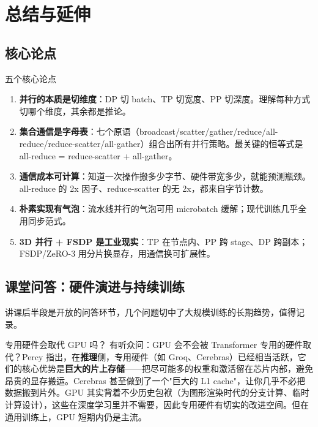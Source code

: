 \documentclass[a4paper]{article}
\begin{document}
\section{总结与延伸}

\subsection{核心论点}

\begin{importantbox}{五个核心论点}
\begin{enumerate}
\item \textbf{并行的本质是切维度}：DP 切 batch、TP 切宽度、PP 切深度。理解每种方式切哪个维度，其余都是推论。
\item \textbf{集合通信是字母表}：七个原语（broadcast/scatter/gather/reduce/all-reduce/reduce-scatter/all-gather）组合出所有并行策略。最关键的恒等式是 all-reduce = reduce-scatter + all-gather。
\item \textbf{通信成本可计算}：知道一次操作搬多少字节、硬件带宽多少，就能预测瓶颈。all-reduce 的 2x 因子、reduce-scatter 的无 2x，都来自字节计数。
\item \textbf{朴素实现有气泡}：流水线并行的气泡可用 microbatch 缓解；现代训练几乎全用同步范式。
\item \textbf{3D 并行 + FSDP 是工业现实}：TP 在节点内、PP 跨 stage、DP 跨副本；FSDP/ZeRO-3 用分片换显存，用通信换可扩展性。
\end{enumerate}
\end{importantbox}

\subsection{课堂问答：硬件演进与持续训练}

讲课后半段是开放的问答环节，几个问题切中了大规模训练的长期趋势，值得记录。

\begin{knowledgebox}{专用硬件会取代 GPU 吗？}
有听众问：GPU 会不会被 Transformer 专用的硬件取代？Percy 指出，在\textbf{推理}侧，专用硬件（如 Groq、Cerebras）已经相当活跃，它们的核心优势是\textbf{巨大的片上存储}——把尽可能多的权重和激活留在芯片内部，避免昂贵的显存搬运。Cerebras 甚至做到了一个"巨大的 L1 cache"，让你几乎不必把数据搬到片外。GPU 其实背着不少历史包袱（为图形渲染时代的分支计算、临时计算设计），这些在深度学习里并不需要，因此专用硬件有切实的改进空间。但在通用训练上，GPU 短期内仍是主流。
\end{knowledgebox}
\end{document}
